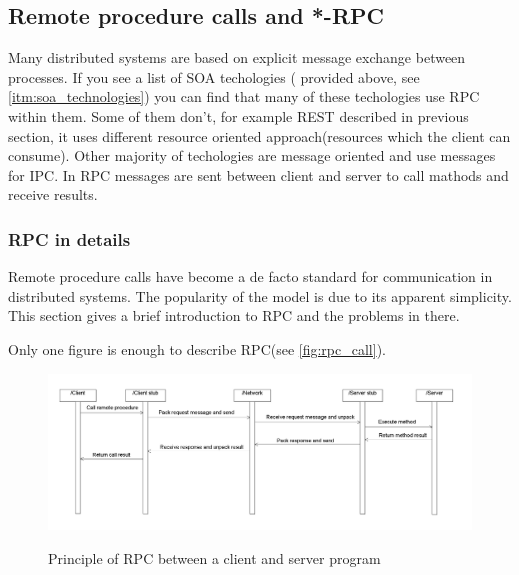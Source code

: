 \subsection{Remote procedure calls and *-RPC}
\label{sec:rpc}
Many distributed systems are based on explicit message exchange
between processes. If you see a list of SOA techologies ( provided above, see
\autoref{itm:soa_technologies}) you can find that many of these techologies use
RPC within them. Some of them don't, for example REST described in  previous
section, it uses different resource oriented approach(resources which
the client can consume). Other majority of techologies are message oriented and
use messages for \gls{IPC}. In RPC messages are sent between client and server
to call mathods and receive results. 

\subsubsection{RPC in details}
Remote procedure calls have become a de facto standard for communication
in distributed systems\cite{tanenbaum07}. The popularity of the model is due to
its apparent simplicity.
This section gives a brief introduction to RPC and the problems in there.

Only one figure is enough to describe RPC(see \autoref{fig:rpc_call}).

% 



\begin{figure}
\centering
\scalebox{0.4}
{\includegraphics{../images/background/rpc_diagram.png}}
\caption{Principle of RPC between a client and server program}
\label{fig:rpc_call}
\end{figure}


